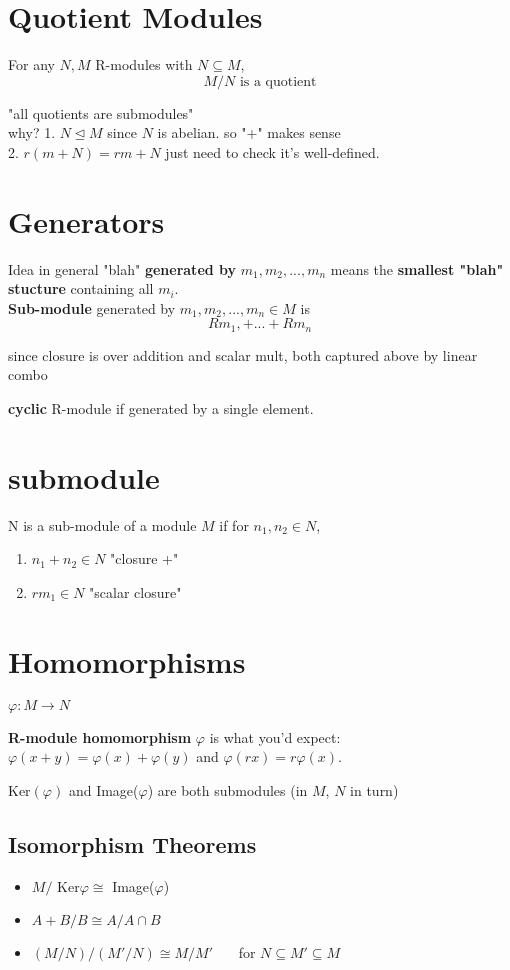 \documentclass[12pt]{article}
\newcommand{\bt}[1]{\textbf{#1}} %
\begin{document}
\section*{Quotient Modules}
For any $N, M$ R-modules with $N \subseteq M$, 
$$M / N \text{ is a quotient}$$

"all quotients are submodules"\\
why? 
\textcolor[gray]{0.5}{
1. $N \trianglelefteq M$ since $N$ is abelian. so "+" makes sense\\
2. $r(m + N) = rm + N$ just need to check it's well-defined.
}

\section*{Generators}
Idea in general "blah" \bt{generated by} $m_1, m_2, ..., m_n$ means the \bt{smallest "blah" stucture} containing all $m_i$.\\

\bt{Sub-module} generated by $m_1, m_2, ..., m_n \in M$ is 
$$R m_1, + ... + Rm_n$$

\textcolor[gray]{0.5}{since closure is over addition and scalar mult, both captured above by linear combo}

\bt{cyclic} R-module if generated by a single element.

\section*{submodule}
N is a sub-module of a module $M$ if for $n_1, n_2 \in N$, 
\begin{enumerate}
    \item $n_1 + n_2 \in N $ "closure +"
    \item $r m_1 \in N$ "scalar closure"
\end{enumerate}


\section*{Homomorphisms}
$\varphi: M \rightarrow N$

\bt{R-module homomorphism} $\varphi$ is what you'd expect:\\ $\varphi(x+y) = \varphi(x) + \varphi(y)$ and $\varphi(rx) = r \varphi(x)$.


Ker$(\varphi)$ and Image($\varphi$) are both submodules (in $M$, $N$ in turn)\\

\subsection*{Isomorphism Theorems}
\begin{itemize}
    \item $M / $ Ker$\varphi \cong $ Image($\varphi$)
    \item $A + B / B \cong A / A \cap B$
    \item $(M / N) / (M' / N) \cong M / M'$   \ \ \ for $N \subseteq M' \subseteq M$
\end{itemize}
\end{document}
